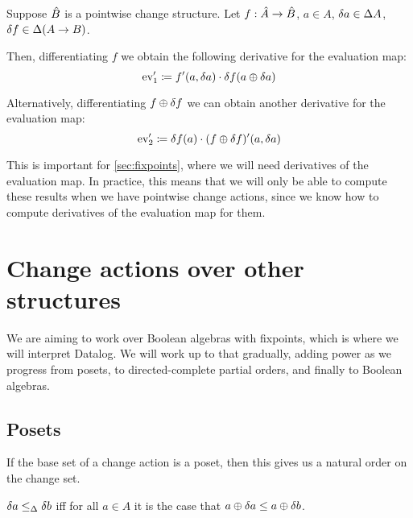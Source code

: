 \begin{prop}
\label{prop:evDerivatives}
  Suppose $\hat{B}$ is a pointwise change structure. Let
  $f: \hat{A} \rightarrow \hat{B}$,
  $a \in A$, $\delta a \in \Delta A$,
  $\delta f \in \Delta (A \rightarrow B)$.

  Then, differentiating $f$ we obtain the following derivative for the evaluation map:
  \begin{displaymath}
    \operatorname{ev}'_1 \coloneqq f'(a, \delta a) \cdot \delta f(a \oplus \delta a)
  \end{displaymath}

  Alternatively, differentiating $f \oplus \delta f$ we can obtain another derivative
  for the evaluation map:
  \begin{displaymath}
    \operatorname{ev}'_2 \coloneqq \delta f(a) \cdot (f \oplus \delta f)'(a, \delta a)
  \end{displaymath}
\end{prop}

This is important for \cref{sec:fixpoints}, where we will need derivatives of
the evaluation map. In practice, this means that we will only be able to compute
these results when we have pointwise change actions, since we know how to
compute derivatives of the evaluation map for them.

\section{Change actions over other structures}
\label{sec:moreStructures}

We are aiming to work over Boolean algebras with fixpoints, which is where we
will interpret Datalog. We will work up to that gradually, adding power as we
progress from posets, to directed-complete partial orders, and
finally to Boolean algebras.

\subsection{Posets}

If the base set of a change action is a poset, then this gives us a natural
order on the change set.

\begin{defn}
  $\delta a \leq_\Delta \delta b$ iff for all $a \in A$ it is the case that $a \oplus \delta a \leq a \oplus \delta b$.
\end{defn}

